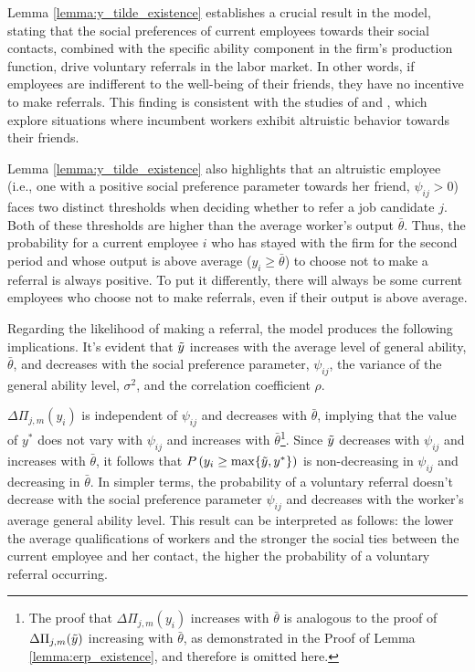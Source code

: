 \documentclass[12pt]{article}
\begin{document}
Lemma \ref{lemma:y_tilde_existence} establishes a crucial result in the model, stating that the social preferences of current employees towards their social contacts, combined with the specific ability component in the firm's production function, drive voluntary referrals in the labor market. In other words, if employees are indifferent to the well-being of their friends, they have no incentive to make referrals. This finding is consistent with the studies of \cite{bandiera2009social} and \cite{friebel2023employee}, which explore situations where incumbent workers exhibit altruistic behavior towards their friends.

Lemma \ref{lemma:y_tilde_existence} also highlights that an altruistic employee (i.e., one with a positive social preference parameter towards her friend, $\psi_{ij} > 0$) faces two distinct thresholds when deciding whether to refer a job candidate $j$. Both of these thresholds are higher than the average worker's output $\bar{\theta}$. Thus, the probability for a current employee $i$ who has stayed with the firm for the second period and whose output is above average ($y_i \geq \bar{\theta}$) to choose not to make a referral is always positive. To put it differently, there will always be some current employees who choose not to make referrals, even if their output is above average. %

Regarding the likelihood of making a referral, the model produces the following implications. It's evident that $\Tilde{y}$ increases with the average level of general ability, $\bar{\theta}$, and decreases with the social preference parameter, $\psi_{ij}$, the variance of the general ability level, $\sigma^2$, and the correlation coefficient $\rho$. %

$\Delta\Pi_{j,m}(y_i)$ is independent of $\psi_{ij}$ and decreases with $\bar{\theta}$, implying that the value of $y^*$ does not vary with $\psi_{ij}$ and increases with $\bar{\theta}$\footnote{The proof that $\Delta\Pi_{j,m}(y_i)$ increases with $\bar{\theta}$ is analogous to the proof of $\Delta\Pi_{j,m}(\Tilde{y})$ increasing with $\bar{\theta}$, as demonstrated in the Proof of Lemma \ref{lemma:erp_existence}, and therefore is omitted here.}. Since $\Tilde{y}$ decreases with $\psi_{ij}$ and increases with $\bar{\theta}$, it follows that $P\left( y_i \geq \max\lbrace\Tilde{y}, y^* \rbrace \right)$ is non-decreasing in $\psi_{ij}$ and decreasing in $\bar{\theta}$. In simpler terms, the probability of a voluntary referral doesn't decrease with the social preference parameter $\psi_{ij}$ and decreases with the worker's average general ability level. This result can be interpreted as follows: the lower the average qualifications of workers and the stronger the social ties between the current employee and her contact, the higher the probability of a voluntary referral occurring.
\end{document}
